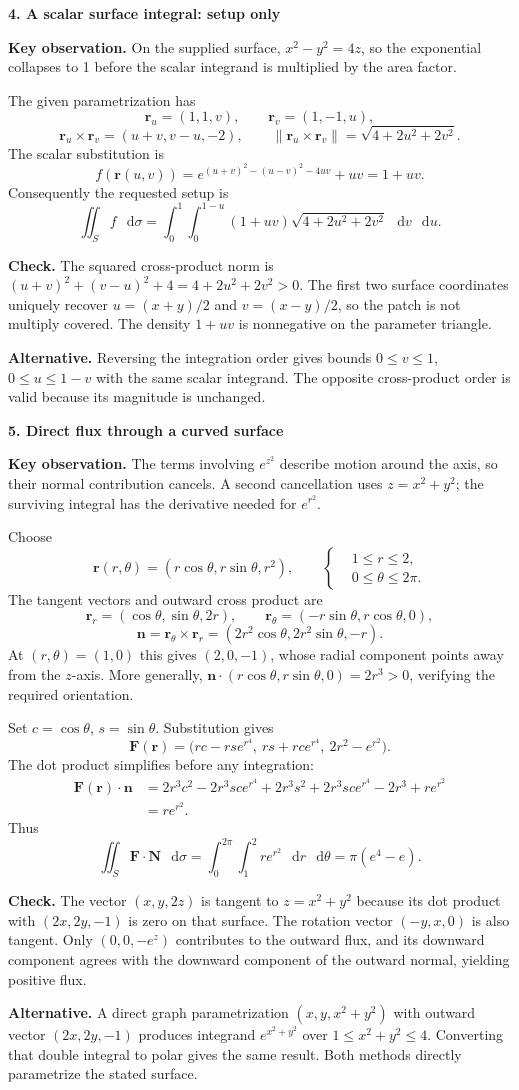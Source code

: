 \documentclass[11pt,letterpaper]{article}
\renewcommand{\vec}[1]{\mathbf{#1}}
\newcommand{\dd}{\mathop{}\!\mathrm{d}}
\newcommand{\solutionproblem}[3]{%
  \par\bigskip\Needspace{7\baselineskip}
  \noindent\textbf{#1. #2}\par\nobreak
}
\newcommand{\insight}[1]{\par\textbf{Key observation.} #1\par}
\newcommand{\verification}[1]{\par\textbf{Check.} #1\par}
\newcommand{\alternative}[1]{\par\textbf{Alternative.} #1\par}
\begin{document}
\solutionproblem{4}{A scalar surface integral: setup only}{12}
\insight{On the supplied surface, $x^2-y^2=4z$, so the exponential
collapses to 1 before the scalar integrand is multiplied by the area
factor.}
The given parametrization has
\[
\vec r_u=(1,1,v),\qquad \vec r_v=(1,-1,u),
\]
\[
\vec r_u\times\vec r_v=(u+v,v-u,-2),\qquad
\lVert\vec r_u\times\vec r_v\rVert=\sqrt{4+2u^2+2v^2}.
\]
The scalar substitution is
\[
f(\vec r(u,v))
=e^{(u+v)^2-(u-v)^2-4uv}+uv
=1+uv.
\]
Consequently the requested setup is
\[
\boxed{\iint_S f\,\dd\sigma
=\int_0^1\int_0^{1-u}(1+uv)\sqrt{4+2u^2+2v^2}\,\dd v\,\dd u}.
\]
\verification{The squared cross-product norm is
$(u+v)^2+(v-u)^2+4=4+2u^2+2v^2>0$. The first two surface coordinates
uniquely recover $u=(x+y)/2$ and $v=(x-y)/2$, so the patch is not
multiply covered. The density $1+uv$ is nonnegative on the parameter
triangle.}
\alternative{Reversing the integration order gives bounds
$0\le v\le1$, $0\le u\le1-v$ with the same scalar integrand. The
opposite cross-product order is valid because its magnitude is unchanged.}

\solutionproblem{5}{Direct flux through a curved surface}{20}
\insight{The terms involving $e^{z^2}$ describe motion around the axis,
so their normal contribution cancels. A second cancellation uses
$z=x^2+y^2$; the surviving integral has the derivative needed for
$e^{r^2}$.}
Choose
\[
\vec r(r,\theta)=(r\cos\theta,r\sin\theta,r^2),\qquad
\left\{\begin{aligned}
&1\le r\le2,\\
&0\le\theta\le2\pi.
\end{aligned}\right.
\]
The tangent vectors and outward cross product are
\[
\vec r_r=(\cos\theta,\sin\theta,2r),\qquad
\vec r_\theta=(-r\sin\theta,r\cos\theta,0),
\]
\[
\vec n=\vec r_\theta\times\vec r_r
=(2r^2\cos\theta,2r^2\sin\theta,-r).
\]
At $(r,\theta)=(1,0)$ this gives $(2,0,-1)$, whose radial component
points away from the $z$-axis. More generally,
$\vec n\cdot(r\cos\theta,r\sin\theta,0)=2r^3>0$, verifying the
required orientation.

Set $c=\cos\theta$, $s=\sin\theta$. Substitution gives
\[
\vec F(\vec r)=
\bigl(rc-rs e^{r^4},\ rs+rc e^{r^4},\ 2r^2-e^{r^2}\bigr).
\]
The dot product simplifies before any integration:
\[
\begin{aligned}
\vec F(\vec r)\cdot\vec n
&=2r^3c^2-2r^3sc e^{r^4}
 +2r^3s^2+2r^3sc e^{r^4}
 -2r^3+r e^{r^2}\\
&=r e^{r^2}.
\end{aligned}
\]
Thus
\[
\boxed{\iint_S\vec F\cdot\vec N\,\dd\sigma
=\int_0^{2\pi}\int_1^2r e^{r^2}\,\dd r\,\dd\theta
=\pi(e^4-e)}.
\]
\verification{The vector $(x,y,2z)$ is tangent to $z=x^2+y^2$ because
its dot product with $(2x,2y,-1)$ is zero on that surface.
The rotation vector $(-y,x,0)$ is also tangent. Only $(0,0,-e^z)$
contributes to the outward flux, and its downward component agrees with
the downward component of the outward normal, yielding positive flux.}
\alternative{A direct graph parametrization $(x,y,x^2+y^2)$ with
outward vector $(2x,2y,-1)$ produces integrand $e^{x^2+y^2}$ over
$1\le x^2+y^2\le4$. Converting that double integral to polar gives
the same result. Both methods directly parametrize the stated surface.}
\end{document}
